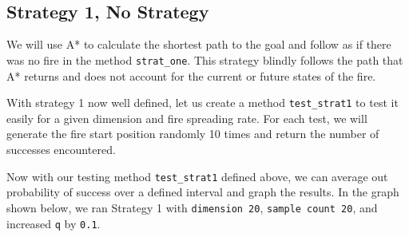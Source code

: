 \documentclass[11pt]{article}
\begin{document}
    \begin{center}
    \end{center}
    { \hspace*{\fill} \\}
    
    \begin{center}
    \end{center}
    { \hspace*{\fill} \\}
    
    \hypertarget{strategy-1-no-strategy}{%
\subsection{Strategy 1, No Strategy}\label{strategy-1-no-strategy}}

We will use A* to calculate the shortest path to the goal and follow as
if there was no fire in the method \texttt{strat\_one}. This strategy
blindly follows the path that A* returns and does not account for the
current or future states of the fire.

    With strategy 1 now well defined, let us create a method
\texttt{test\_strat1} to test it easily for a given dimension and fire
spreading rate. For each test, we will generate the fire start position
randomly 10 times and return the number of successes encountered.

    Now with our testing method \texttt{test\_strat1} defined above, we can
average out probability of success over a defined interval and graph the
results. In the graph shown below, we ran Strategy 1 with
\texttt{dimension\ 20}, \texttt{sample\ count\ 20}, and increased
\texttt{q} by \texttt{0.1}.
\end{document}
